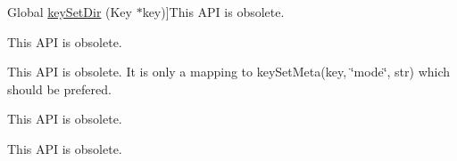 \begin{DoxyRefList}
Global \hyperlink{group__keymeta_gaae575bd86a628a15ee45baa860522e75}{key\-Set\-Dir} (Key $\ast$key)]This A\-P\-I is obsolete. 
\item[\label{deprecated__deprecated000005}%
\hypertarget{deprecated__deprecated000005}{}%
Global \hyperlink{group__keymeta_ga9e3d0fb3f7ba906e067727b9155d22e3}{key\-Set\-G\-I\-D} (Key $\ast$key, gid\-\_\-t gid)]This A\-P\-I is obsolete. 
\item[\label{deprecated__deprecated000008}%
\hypertarget{deprecated__deprecated000008}{}%
Global \hyperlink{group__keymeta_ga8803037e35b9da1ce492323a88ff6bc3}{key\-Set\-Mode} (Key $\ast$key, mode\-\_\-t mode)]This A\-P\-I is obsolete. It is only a mapping to key\-Set\-Meta(key, \char`\"{}mode\char`\"{}, str) which should be prefered. 
\item[\label{deprecated__deprecated000012}%
\hypertarget{deprecated__deprecated000012}{}%
Global \hyperlink{group__keymeta_ga481d8997187992fe4bbf288bc8ef4db7}{key\-Set\-M\-Time} (Key $\ast$key, time\-\_\-t mtime)]This A\-P\-I is obsolete. 
\item[\label{deprecated__deprecated000003}%
\hypertarget{deprecated__deprecated000003}{}%
Global \hyperlink{group__keymeta_gab5f284f5ecd261e0a290095f50ba1af7}{key\-Set\-U\-I\-D} (Key $\ast$key, uid\-\_\-t uid)]This A\-P\-I is obsolete.
\end{DoxyRefList}